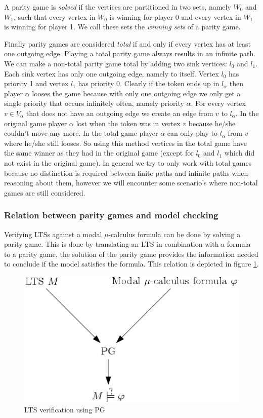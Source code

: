 A parity game is \textit{solved} if the vertices are partitioned in two sets, namely $W_0$ and $W_1$, such that every vertex in $W_0$ is winning for player 0 and every vertex in $W_1$ is winning for player 1. We call these sets the \textit{winning sets} of a parity game.

Finally parity games are considered \textit{total} if and only if every vertex has at least one outgoing edge. Playing a total parity game always results in an infinite path. We can make a non-total parity game total by adding two sink vertices: $l_0$ and $l_1$. Each sink vertex has only one outgoing edge, namely to itself. Vertex $l_0$ has priority 1 and vertex $l_1$ has priority 0. Clearly if the token ends up in $l_\alpha$ then player $\alpha$ looses the game because with only one outgoing edge we only get a single priority that occurs infinitely often, namely priority $\overline{\alpha}$. For every vertex $v \in V_\alpha$ that does not have an outgoing edge we create an edge from $v$ to $l_\alpha$. In the original game player $\alpha$ lost when the token was in vertex $v$ because he/she couldn't move any more. In the total game player $\alpha$ can only play to $l_\alpha$ from $v$ where he/she still looses. So using this method vertices in the total game have the same winner as they had in the original game (except for $l_0$ and $l_1$ which did not exist in the original game). In general we try to only work with total games because no distinction is required between finite paths and infinite paths when reasoning about them, however we will encounter some scenario's where non-total games are still considered.

\subsubsection{Relation between parity games and model checking}
Verifying LTSs against a modal $\mu$-calculus formula can be done by solving a parity game. This is done by translating an LTS in combination with a formula to a parity game, the solution of the parity game provides the information needed to conclude if the model satisfies the formula. This relation is depicted in figure \ref{fig:ltsverificationusingpg}. 
\begin{figure}[h]
	\centering
	\includegraphics[scale=0.5]{Diagrams/LTSVerificationUsingPG}
	\caption[LTS verification using PG]{LTS verification using PG}
	\label{fig:ltsverificationusingpg}
\end{figure}

